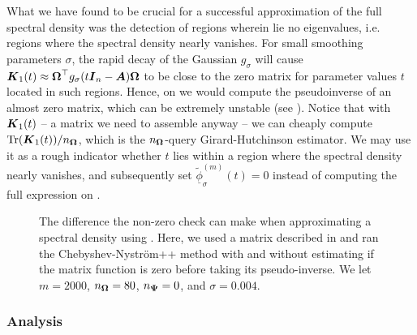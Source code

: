 What we have found to be crucial for a successful approximation of the full spectral density was the detection of regions wherein lie no eigenvalues, i.e. regions where the spectral density nearly vanishes. For small smoothing parameters $\sigma$, the rapid decay of the Gaussian $g_{\sigma}$ will cause $\boldsymbol{K}_1(t) \approx \boldsymbol{\Omega}^{\top} g_{\sigma}(t\boldsymbol{I}_n - \boldsymbol{A}) \boldsymbol{\Omega}$ to be close to the zero matrix for parameter values $t$ located in such regions. Hence, on  we would compute the pseudoinverse of an almost zero matrix, which can be extremely unstable (see ). Notice that with $\boldsymbol{K}_1(t)$ -- a matrix we need to assemble anyway -- we can cheaply compute $\operatorname{Tr}(\boldsymbol{K}_1(t)) / n_{\boldsymbol{\Omega}}$, which is the $n_{\boldsymbol{\Omega}}$-query Girard-Hutchinson estimator. We may use it as a rough indicator whether $t$ lies within a region where the spectral density nearly vanishes, and subsequently set $\widetilde{\underline{\phi}}_{\sigma}^{(m)}(t) = 0$ instead of computing the full expression on .

\begin{figure}[ht]
    \centering
    
    \caption{The difference the non-zero check can make when approximating a spectral density using . Here, we used a matrix described in  and ran the Chebyshev-Nyström++ method with and without estimating if the matrix function is zero before taking its pseudo-inverse. We let $m=2000$, $n_{\boldsymbol{\Omega}}=80$, $n_{\boldsymbol{\Psi}}=0$, and $\sigma = 0.004$.}
    \label{fig:zerocheck}
\end{figure}

\subsubsection{Analysis}
\label{subsubsec:chebyshev-nystrom-analysis}

